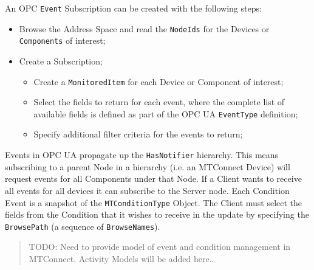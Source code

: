 An OPC \texttt{Event} Subscription can be created with the following steps: 

\begin{itemize}
\item Browse the Address Space and read the \texttt{NodeIds} for the Devices or \texttt{Components} of interest;
\item Create a Subscription;
    \begin{itemize}
    \item Create a \texttt{MonitoredItem} for each Device or Component of interest;
    \item Select the fields to return for each event, where the complete list of available fields is defined as part of the OPC UA \texttt{EventType} definition;
    \item Specify additional filter criteria for the events to return; 
    \end{itemize}
\end{itemize}

Events in OPC UA propagate up the \texttt{HasNotifier} hierarchy. This means subscribing to a parent Node in a hierarchy (i.e. an MTConnect Device) will request events for all Components under that Node. If a Client wants to receive all events for all devices it can subscribe to the Server node.
Each Condition Event is a snapshot of the \texttt{MTConditionType} Object. The Client must select the fields from the Condition that it wishes to receive in the update by specifying the \texttt{BrowsePath} (a sequence of \texttt{BrowseNames}). 

\begin{quote}
    \color{red}
    TODO: Need to provide model of event and condition management in MTConnect. Activity Models will be added here..
\end{quote}

\clearpage
